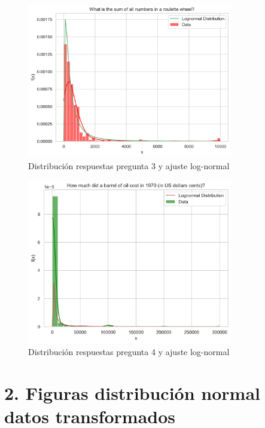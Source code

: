\begin{figure}[h]
\centering
    \includegraphics[width=0.8\textwidth]{figures/appendix_1/roullette_distribution_log.png}
\caption{Distribución respuestas pregunta 3 y ajuste log-normal}
\end{figure}

\begin{figure}[h]
\centering
    \includegraphics[width=0.8\textwidth]{figures/appendix_1/oil_distribution_log.png}
\caption{Distribución respuestas pregunta 4 y ajuste log-normal}
\end{figure}

\FloatBarrier
 
\section*{2. Figuras distribución normal datos transformados}
 \label{appendix2}

